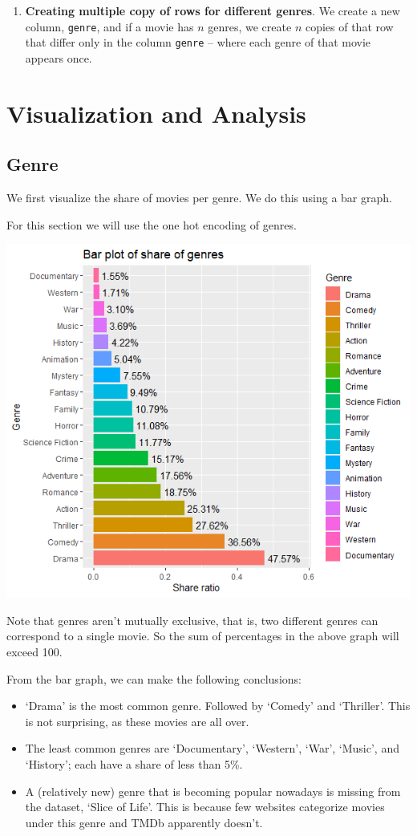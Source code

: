 \documentclass[10pt]{article}
\begin{document}
\begin{multicols}{2}
\begin{enumerate}
    \item \textbf{Creating multiple copy of rows for different genres}. We create a new column, \texttt{genre}, and if a movie has $n$ genres, we create $n$ copies of that row that differ only in the column \texttt{genre} -- where each genre of that movie appears once.  
\end{enumerate} 

\section{Visualization and Analysis}

\subsection{Genre}

We first visualize the share of movies per genre. We do this using a bar graph.

For this section we will use the one hot encoding of genres.

\includegraphics[scale=0.5]{share_genres.png}

Note that genres aren't mutually exclusive, that is, two different genres can correspond to a single movie. 
So the sum of percentages in the above graph will exceed 100.

From the bar graph, we can make the following conclusions:

\begin{itemize}
    \item `Drama' is the most common genre. Followed by `Comedy' and `Thriller'.
    This is not surprising, as these movies are all over.
    \item The least common genres are `Documentary', `Western', `War', `Music', and `History'; each have a share of less than 5\%.
    \item A (relatively new) genre that is becoming popular nowadays is missing from the dataset, `Slice of Life'. 
    This is because few websites categorize movies under this genre and TMDb apparently doesn't.
\end{itemize}


\end{multicols}
\end{document}

